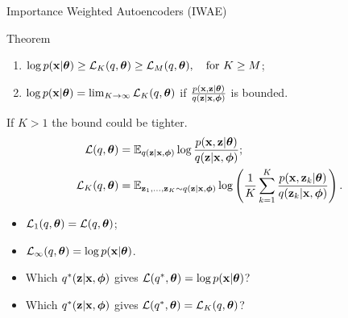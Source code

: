 \documentclass{beamer}
\begin{document}
\begin{frame}{Importance Weighted Autoencoders (IWAE)}
	\begin{block}{Theorem}
		\begin{enumerate}
			\item $\log p(\mathbf{x} | \boldsymbol{\theta}) \geq \mathcal{L}_K (q, \boldsymbol{\theta}) \geq \mathcal{L}_M (q, \boldsymbol{\theta}), \quad \text{for } K \geq M$;
			\item $\log p(\mathbf{x} | \boldsymbol{\theta}) = \lim_{K \rightarrow \infty} \mathcal{L}_K (q, \boldsymbol{\theta})$ if $\frac{p(\mathbf{x}, \mathbf{z} | \boldsymbol{\theta})}{q(\mathbf{z} | \mathbf{x}, \boldsymbol{\phi})}$ is bounded.
		\end{enumerate}
		\vspace{-0.2cm}
	\end{block}
	If $K > 1$ the bound could be tighter.
	\begin{align*}
		\mathcal{L} (q, \boldsymbol{\theta}) &= \mathbb{E}_{q(\mathbf{z} | \mathbf{x}, \boldsymbol{\phi})} \log \frac{p(\mathbf{x}, \mathbf{z} | \boldsymbol{\theta})}{q(\mathbf{z}| \mathbf{x}, \boldsymbol{\phi})}; \\
		\mathcal{L}_K (q, \boldsymbol{\theta}) &= \mathbb{E}_{\mathbf{z}_1, \dots, \mathbf{z}_K \sim q(\mathbf{z} | \mathbf{x}, \boldsymbol{\phi})} \log \left( \frac{1}{K}\sum_{k=1}^K\frac{p(\mathbf{x}, \mathbf{z}_k | \boldsymbol{\theta})}{q(\mathbf{z}_k| \mathbf{x}, \boldsymbol{\phi})} \right).
	\end{align*}
	\vspace{-0.2cm}
	\begin{itemize}
		\item $\mathcal{L}_1(q, \boldsymbol{\theta}) = \mathcal{L}(q, \boldsymbol{\theta})$;
		\item $\mathcal{L}_{\infty}(q, \boldsymbol{\theta}) = \log p(\mathbf{x} | \boldsymbol{\theta})$.
		\item Which $q^*(\mathbf{z} | \mathbf{x}, \boldsymbol{\phi})$ gives $\mathcal{L}(q^*, \boldsymbol{\theta}) = \log p(\mathbf{x} | \boldsymbol{\theta})$? 
		\item Which $q^*(\mathbf{z} | \mathbf{x}, \boldsymbol{\phi})$ gives $\mathcal{L}(q^*, \boldsymbol{\theta}) = \mathcal{L}_K(q, \boldsymbol{\theta})$?
	\end{itemize}

\end{frame}
\end{document}
